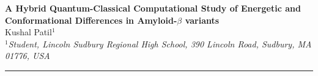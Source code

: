 \documentclass[10pt,a4paper]{article}
\begin{document}
	\vspace{7.5mm}
	
	\begin{center}
		{\Large \textbf{A Hybrid Quantum-Classical Computational
Study of Energetic and Conformational Differences in Amyloid-$\beta$ variants}}\\
		\vspace{2mm}
		{\large Kushal Patil$^{1}$}\\
		\vspace{7.5mm}
		$^1$\textit{Student, Lincoln Sudbury Regional High School, 390 Lincoln Road, Sudbury, MA 01776, USA} \\
	\end{center}

	\begin{center}
		\textcolor{azul}{\rule{150mm}{0.5mm}}
	\end{center}		
\end{document}
